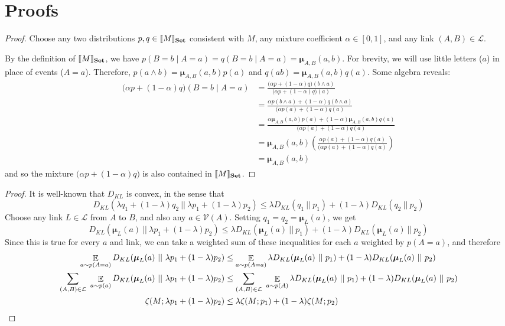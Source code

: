 \documentclass{article}
\newcommand\Set{\textbf{Set}}
\newcommand\bmu{\boldsymbol{\mu}}
\begin{document}
	\section{Proofs}
	\thmsetconvex*
	\begin{proof}
		Choose any two distributions $p, q \in \bbr{M}_\Set$ consistent with $M$, any mixture coefficient $\alpha \in [0,1]$, and any link $(A,B) \in \mathcal L$.
		
		By the definition of $\bbr{M}_\Set$, we have $p(B = b \mid A = a) = q(B = b \mid A = a) = \bmu_{A,B}(a,b)$.  
		For brevity, we will use little letters ($a$) in place of events ($A = a$).
		Therefore, $p(a\land b) = \bmu_{A,B}(a,b) p(a)$ and $q(ab) = \bmu_{A,B}(a,b) q(a)$. Some algebra reveals:
		\begin{align*}
			\Big( \alpha p + (1-\alpha) q \Big) (B = b \mid A = a) &= 
			\frac{\Big( \alpha p + (1-\alpha) q \Big) (b \land a)}{\Big( \alpha p + (1-\alpha) q \Big) (a)} \\
			&= \frac{ \alpha p(b \land a) + (1-\alpha) q(b \land a) }{\Big( \alpha p(a) + (1-\alpha) q (a)} \\
			&= \frac{ \alpha \bmu_{A,B}(a,b) p(a) + (1-\alpha) \bmu_{A,B}(a,b) q(a) }{\Big( \alpha p(a) + (1-\alpha) q (a)} \\
			&=\bmu_{A,B}(a,b) \left(\frac{ \alpha  p(a) + (1-\alpha) q(a) }{\Big( \alpha p(a) + (1-\alpha) q (a)}\right)\\
			&= \bmu_{A,B}(a,b)
		\end{align*}
		and so the mixture $\Big(\alpha p + (1-\alpha) q \Big)$ is also contained in $\bbr{M}_\Set$.
	\end{proof}
	
	
	\thmzetaconvex*
	\begin{proof}
		It is well-known that $D_{KL}$ is convex, in the sense that 
		\[ D_{KL}(\lambda q_1 + (1-\lambda) q_2 \ ||\ \lambda p_1 + (1-\lambda) p_2) \leq \lambda D_{KL} (q_1\ ||\ p_1) + (1-\lambda) D_{KL}(q_2\ ||\ p_2) \]
		Choose any link $L \in \mathcal L$ from $A$ to $B$, and also any $a \in \mathcal V(A)$. 
		Setting $q_1 = q_2 = \bmu_L(a)$, we get
		\[ D_{KL}(\bmu_L(a) \ ||\ \lambda p_1 + (1-\lambda) p_2) \leq \lambda D_{KL} (\bmu_L(a) \ ||\ p_1) + (1-\lambda) D_{KL}(\bmu_L(a)\ ||\ p_2) \]
		Since this is true for every $a$ and link, we can take a weighted sum of these inequalities for each $a$ weighted by $p(A=a)$, and therefore
		\begin{align*}
			\E_{a\sim p(A=a)} D_{KL}(\bmu_L(a) \ ||\ \lambda p_1 + (1-\lambda) p_2) &\leq \E_{a\sim p(A=a)}\lambda D_{KL} (\bmu_L(a) \ ||\ p_1) + (1-\lambda) D_{KL}(\bmu_L(a)\ ||\ p_2) \\
			\sum_{(A, B) \in \cal L}~\E_{a\sim p(a)} D_{KL}(\bmu_L(a) \ ||\ \lambda p_1 + (1-\lambda) p_2) &\leq \sum_{(A, B) \in \cal L}~\E_{a\sim p(A)}\lambda D_{KL} (\bmu_L(a) \ ||\ p_1) + (1-\lambda) D_{KL}(\bmu_L(a)\ ||\ p_2) \\
			\zeta(M ; \lambda p_1 + (1-\lambda)p_2) &\leq \lambda \zeta(M;p_1) + (1-\lambda) \zeta(M;p_2)
		\end{align*}
	\end{proof}
\end{document}
